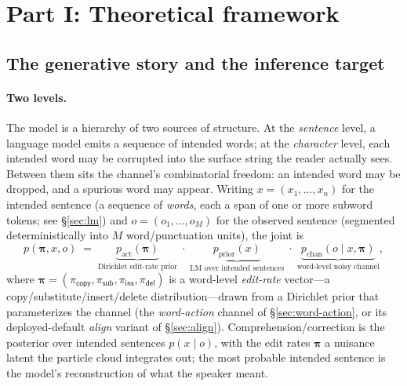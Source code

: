 \documentclass[11pt]{article}
\providecommand{\given}{\mid}
\providecommand{\copyact}{\textsf{copy}}
\providecommand{\subact}{\textsf{sub}}
\providecommand{\insact}{\textsf{ins}}
\providecommand{\delact}{\textsf{del}}
\providecommand{\actdist}{\bm{\pi}}            %
\providecommand{\pcopy}{\pi_{\copyact}}
\providecommand{\psub}{\pi_{\subact}}
\providecommand{\pins}{\pi_{\insact}}
\providecommand{\pdel}{\pi_{\delact}}
\begin{document}
\tableofcontents
\fi

\section{Part I: Theoretical framework}
\label{part:theory}

\subsection{The generative story and the inference target}
\label{sec:overview}

\paragraph{Two levels.} The model is a hierarchy of two sources of structure. At the \emph{sentence} level, a language model emits a sequence of intended words; at the \emph{character} level, each intended word may be corrupted into the surface string the reader actually sees. Between them sits the channel's combinatorial freedom: an intended word may be dropped, and a spurious word may appear. Writing $x = (x_1,\dots,x_n)$ for the intended sentence (a sequence of \emph{words}, each a span of one or more subword tokens; see \S\ref{sec:lm}) and $o = (o_1,\dots,o_M)$ for the observed sentence (segmented deterministically into $M$ word/punctuation units), the joint is
\begin{equation}\label{eq:joint-abstract}
  p(\actdist, x, o) \;=\; \underbrace{p_{\mathrm{act}}(\actdist)}_{\text{Dirichlet edit-rate prior}}
              \;\cdot\; \underbrace{p_{\mathrm{prior}}(x)}_{\text{LM over intended sentences}}
              \;\cdot\; \underbrace{p_{\mathrm{chan}}(o \given x, \actdist)}_{\text{word-level noisy channel}} ,
\end{equation}
where $\actdist = (\pcopy,\psub,\pins,\pdel)$ is a word-level \emph{edit-rate} vector---a copy/substitute/insert/delete distribution---drawn from a Dirichlet prior that parameterizes the channel (the \emph{word-action} channel of \S\ref{sec:word-action}, or its deployed-default \emph{align} variant of \S\ref{sec:align}). Comprehension/correction is the posterior over intended sentences $p(x \given o)$, with the edit rates $\actdist$ a nuisance latent the particle cloud integrates out; the most probable intended sentence is the model's reconstruction of what the speaker meant.
\end{document}
